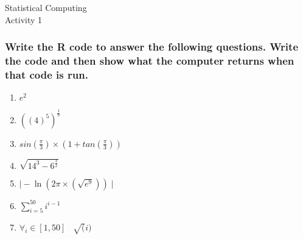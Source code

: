 \documentclass[11pt]{article}
\begin{document}
\begin{center}
{\large    Statistical Computing\\
   Activity 1 }
\end{center}

\subsubsection*{Write the R code to answer the following questions. Write the code and then show what the computer returns when that code is run.}

\flushleft
\begin{enumerate}
\item $e^2$ \vspace{10mm}
\item $((4)^5)^\frac{1}{8}$ \vspace{10mm}
\item $sin(\frac{\pi}{3}) \times (1 + tan(\frac{\pi}{3}))$ \vspace{10mm}
\item $\sqrt{14^3 - 6^\frac{3}{2}} $ \vspace{10mm}
\item $\mid-\ln(2\pi \times (\sqrt{e^9}))\mid$ \vspace{10mm}
\item $\sum_{i=5}^{50}i^{i-1}$ \vspace{10mm}
\item $\forall_{i}\in[1,50] \;\;\; \sqrt(i)$
\end{enumerate}
\end{document}
